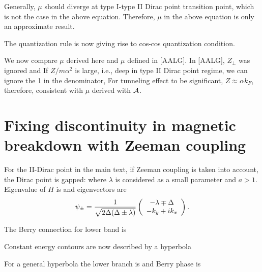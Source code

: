 \documentclass[aps, prb, showpacs, twocolumn, notitlepage, superscriptaddress]{revtex4-1}
\begin{document}
Generally, $\mu$ should diverge at type I-type II Dirac point transition point, which is not the case in the above equation. Therefore, $\mu$ in the above equation is only an approximate result.

The quantization rule is now
giving rise to cos-cos quantization condition.

We now compare $\mu$ derived here and $\mu$ defined in [AALG]. In [AALG], $Z_\perp$ was ignored and
If $Z/m\alpha^2$ is large, i.e., deep in type II Dirac point regime, we can ignore the 1 in the denominator,
For tunneling effect to be significant, $Z\approx \alpha k_F$, therefore,
consistent with $\mu$ derived with ${\cal A}$.

\section{Fixing discontinuity in magnetic breakdown with Zeeman coupling}

For the II-Dirac point in the main text, if Zeeman coupling is taken into account, the Dirac point is gapped:
where $\lambda$ is considered as a small parameter and $a>1$. Eigenvalue of $H$ is 
 and eigenvectors are
\begin{equation}
\psi_\pm=\frac{1}{\sqrt{2\Delta(\Delta\pm\lambda)}}\left(
\begin{array}{c}
-\lambda\mp\Delta\\
-k_y+ik_x
\end{array}
\right).
\end{equation}

The Berry connection for lower band is 

Constant energy contours are now described by a hyperbola


For a general hyperbola
the lower branch is 
and Berry phase is
\end{document}
